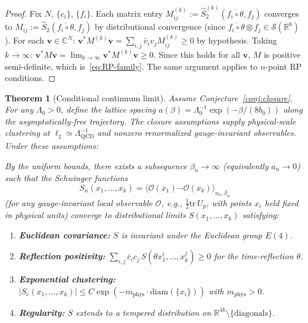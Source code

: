 \documentclass[11pt]{article}
\newtheorem{theorem}{Theorem}[section]
\theoremstyle{definition}
\newcommand{\tr}{\mathrm{tr}}
\newcommand{\R}{\mathbb{R}}
\newcommand{\Lam}{\Lambda_{\mathrm{QCD}}}
\begin{document}
\begin{proof}
Fix $N$, $\{c_i\}$, $\{f_i\}$.  Each matrix entry
$M_{ij}^{(k)}:=\hat S_2^{(k)}(\overline{f_i\circ\theta},f_j)$
converges to $M_{ij}:=\hat S_2(\overline{f_i\circ\theta},f_j)$
by distributional convergence (since
$\overline{f_i\circ\theta}\otimes f_j\in\mathcal{S}(\R^8)$).
For each $\mathbf{v}\in\mathbb{C}^N$:
$\mathbf{v}^*M^{(k)}\mathbf{v}
=\sum_{i,j}\bar v_i v_j M_{ij}^{(k)}\ge 0$
by hypothesis.  Taking $k\to\infty$:
$\mathbf{v}^*M\mathbf{v}
=\lim_{k\to\infty}\mathbf{v}^*M^{(k)}\mathbf{v}\ge 0$.
Since this holds for all $\mathbf{v}$, $M$ is positive
semi-definite, which is~\eqref{eq:RP-family}.
The same argument applies to $n$-point RP conditions.
\end{proof}

\begin{theorem}[Conditional continuum limit]\label{thm:continuum}
Assume Conjecture~\ref{conj:closure}.  For any $\Lambda_0>0$, define
the lattice spacing $a(\beta)=\Lambda_0^{-1}\exp(-\beta/(8b_0))$ along
the asymptotically-free trajectory.  The closure assumptions supply
physical-scale clustering at $\ell_\sharp\simeq\Lam^{-1}$ and nonzero
renormalized gauge-invariant observables.  Under these assumptions:

By the uniform bounds, there exists a subsequence
$\beta_n\to\infty$ (equivalently $a_n\to 0$) such that
the Schwinger functions
\[
S_n(x_1,\ldots,x_k)=\langle\mathcal{O}(x_1)\cdots\mathcal{O}(x_k)
\rangle_{a_n,\beta_n}
\]
(for any gauge-invariant local observable $\mathcal{O}$, e.g.,
$\frac{1}{2}\tr\,U_p$, with points $x_i$ held fixed in physical
units) converge to distributional limits $S(x_1,\ldots,x_k)$
satisfying:
\begin{enumerate}[nosep,label=(\roman*)]
\item \textbf{Euclidean covariance:} $S$ is invariant under the
Euclidean group $E(4)$.
\item \textbf{Reflection positivity:}
$\sum_{i,j}\bar c_i c_j\,S(\theta x_1^i,\ldots,x_k^j)\ge 0$
for the time-reflection $\theta$.
\item \textbf{Exponential clustering:}
$|S_c(x_1,\ldots,x_k)|\le C\exp(-m_{\mathrm{phys}}\cdot
\mathrm{diam}(\{x_i\}))$ with $m_{\mathrm{phys}}>0$.
\item \textbf{Regularity:} $S$ extends to a tempered distribution
on $\R^{4k}\setminus\{\text{diagonals}\}$.


\end{enumerate}
\end{theorem}
\end{document}
